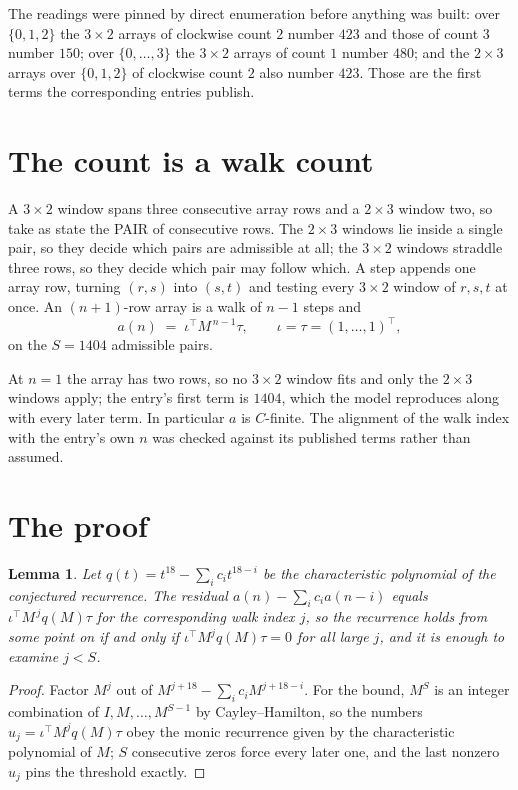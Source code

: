 \documentclass[11pt,a4paper]{article}
\theoremstyle{plain}
\newtheorem{lemma}[theorem]{Lemma}
\theoremstyle{definition}
\begin{document}
The readings were pinned by direct enumeration before anything was built: over
$\{0,1,2\}$ the $3\times2$ arrays of clockwise count $2$ number $423$ and those of count
$3$ number $150$; over $\{0,\dots,3\}$ the $3\times2$ arrays of count $1$ number $480$;
and the $2\times3$ arrays over $\{0,1,2\}$ of clockwise count $2$ also number $423$. Those
are the first terms the corresponding entries publish.

\section{The count is a walk count}

A $3\times2$ window spans three consecutive array rows and a $2\times3$
window two, so take as state the PAIR of consecutive rows. The $2\times3$ windows lie inside a
single pair, so they decide which pairs are admissible at all; the $3\times2$ windows straddle
three rows, so they decide which pair may follow which. A step appends one array row, turning
$(r,s)$ into $(s,t)$ and testing every $3\times2$ window of $r,s,t$ at once. An $(n+1)$-row
array is a walk of $n-1$ steps and
\[
a(n)\;=\;\iota^{\!\top}M^{\,n-1}\tau,\qquad\iota=\tau=(1,\dots,1)^{\!\top},
\]
on the $S=1404$ admissible pairs.

At $n=1$ the array has two rows, so no $3\times2$ window fits and only the
$2\times3$ windows apply; the entry's first term is
$1404$, which the model reproduces along with every later term.
In particular $a$ is $C$-finite. The alignment of the walk index with the entry's own $n$ was
checked against its published terms rather than assumed.

\section{The proof}

\begin{lemma}\label{lem:crit}
Let $q(t)=t^{18}-\sum_i c_it^{18-i}$ be the characteristic polynomial of the
conjectured recurrence. The residual $a(n)-\sum_ic_ia(n-i)$ equals
$\iota^{\!\top}M^{\,j}q(M)\tau$ for the corresponding walk index $j$, so the recurrence
holds from some point on if and only if $\iota^{\!\top}M^{j}q(M)\tau=0$ for all large $j$,
and it is enough to examine $j<S$.
\end{lemma}

\begin{proof}
Factor $M^{j}$ out of $M^{j+18}-\sum_ic_iM^{j+18-i}$. For the bound, $M^{S}$
is an integer combination of $I,M,\dots,M^{S-1}$ by Cayley--Hamilton, so the numbers
$u_j=\iota^{\!\top}M^{j}q(M)\tau$ obey the monic recurrence given by the characteristic
polynomial of $M$; $S$ consecutive zeros force every later one, and the last nonzero $u_j$
pins the threshold exactly.
\end{proof}
\end{document}
